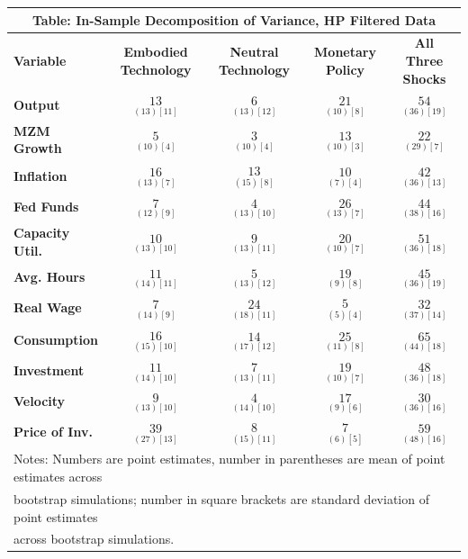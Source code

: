 \documentclass{article}
\begin{document}
 \begin{tabular}{|l|c|@{}c|c|@{}c|} 
 \hline 
 \multicolumn{5}{|c|}{\textbf{Table: In-Sample Decomposition of Variance, HP Filtered Data}} \\ \hline 
 \textbf{Variable} & \textbf{Embodied Technology} & \textbf{Neutral Technology} & \textbf{%
 Monetary Policy} & \textbf{All Three Shocks} \\ \hline\hline 
 \textbf{Output} & $\underset{( 13)[ 11]}{ 13}$ & $\underset{( 13)[ 12]}{  6}$ & $\underset{( 10)[  8]}{ 21}$ & $\underset{( 36)[ 19]}{ 54}$ \\ \hline 
 \textbf{MZM Growth} & $\underset{( 10)[  4]}{  5}$ & $\underset{( 10)[  4]}{  3}$ & $\underset{( 10)[  3]}{ 13}$ & $\underset{( 29)[  7]}{ 22}$ \\ \hline 
 \textbf{Inflation} & $\underset{( 13)[  7]}{ 16}$ & $\underset{( 15)[  8]}{ 13}$ & $\underset{(  7)[  4]}{ 10}$ & $\underset{( 36)[ 13]}{ 42}$ \\ \hline 
 \textbf{Fed Funds} & $\underset{( 12)[  9]}{  7}$ & $\underset{( 13)[ 10]}{  4}$ & $\underset{( 13)[  7]}{ 26}$ & $\underset{( 38)[ 16]}{ 44}$ \\ \hline 
 \textbf{Capacity Util.} & $\underset{( 13)[ 10]}{ 10}$ & $\underset{( 13)[ 11]}{  9}$ & $\underset{( 10)[  7]}{ 20}$ & $\underset{( 36)[ 18]}{ 51}$ \\ \hline 
 \textbf{Avg. Hours} & $\underset{( 14)[ 11]}{ 11}$ & $\underset{( 13)[ 12]}{  5}$ & $\underset{(  9)[  8]}{ 19}$ & $\underset{( 36)[ 19]}{ 45}$ \\ \hline 
 \textbf{Real Wage} & $\underset{( 14)[  9]}{  7}$ & $\underset{( 18)[ 11]}{ 24}$ & $\underset{(  5)[  4]}{  5}$ & $\underset{( 37)[ 14]}{ 32}$ \\ \hline 
 \textbf{Consumption} & $\underset{( 15)[ 10]}{ 16}$ & $\underset{( 17)[ 12]}{ 14}$ & $\underset{( 11)[  8]}{ 25}$ & $\underset{( 44)[ 18]}{ 65}$ \\ \hline 
 \textbf{Investment} & $\underset{( 14)[ 10]}{ 11}$ & $\underset{( 13)[ 11]}{  7}$ & $\underset{( 10)[  7]}{ 19}$ & $\underset{( 36)[ 18]}{ 48}$ \\ \hline 
 \textbf{Velocity} & $\underset{( 13)[ 10]}{  9}$ & $\underset{( 14)[ 10]}{  4}$ & $\underset{(  9)[  6]}{ 17}$ & $\underset{( 36)[ 16]}{ 30}$ \\ \hline 
 \textbf{Price of Inv.} & $\underset{( 27)[ 13]}{ 39}$ & $\underset{( 15)[ 11]}{  8}  $ & $\underset{(  6)[  5]}{  7}$ & $\underset{( 48)[ 16]}{ 59}$ \\ \hline 
 \multicolumn{5}{|l|}{Notes: Numbers are point estimates, number in 
 parentheses are mean of point estimates across} \\ \hline 
 \multicolumn{5}{|l|}{bootstrap simulations; number in square brackets are 
 standard deviation of point estimates} \\ \hline 
 \multicolumn{5}{|l|}{across bootstrap simulations.} \\ \hline 
 \end{tabular} 
\end{document}
